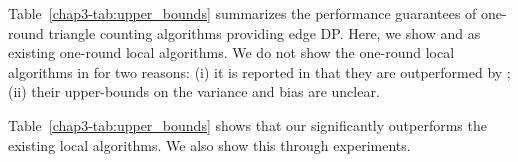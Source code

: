 Table~\ref{chap3-tab:upper_bounds} summarizes the performance guarantees of one-round triangle counting algorithms providing edge DP. 
Here, we show \AlgARRTri{} \cite{Imola_USENIX22} and \AlgRRTri{} \cite{Imola_USENIX21} as existing one-round local algorithms. 
We do not show the one-round local algorithms in \cite{Ye_ICDE20,Ye_TKDE21} for two reasons: (i) it is reported in \cite{Imola_USENIX22} that they are outperformed by \AlgRRTri{}; (ii) their upper-bounds on the variance and bias are unclear. 

Table~\ref{chap3-tab:upper_bounds} shows that our \AlgWSTriVR{} significantly outperforms the existing local algorithms. 
We also show this through experiments. 




